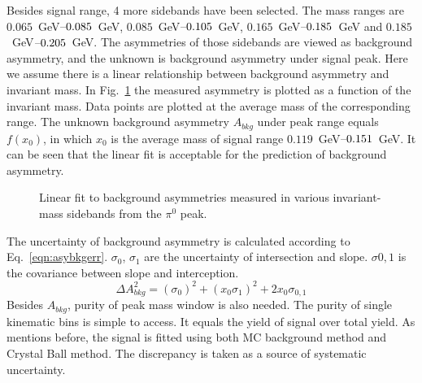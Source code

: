 Besides signal range, 4 more sidebands have been selected. The mass ranges are $0.065$~GeV$\textup{--}0.085$~GeV, $0.085$~GeV$\textup{--}0.105$~GeV, $0.165$~GeV$\textup{--}0.185$~GeV and $0.185$~GeV$\textup{--}0.205$~GeV. The asymmetries of those sidebands are viewed as background asymmetry, and the unknown is background asymmetry under signal peak. Here we assume there is a linear relationship between background asymmetry and invariant mass. In Fig.~\ref{fig:bkgasy}  the measured asymmetry is plotted as a function of the invariant mass. Data points are plotted at the average mass of the corresponding range. The unknown background asymmetry $A_{bkg}$ under peak range equals $f(x_0)$, in which $x_0$ is the average mass of signal range $0.119$~GeV$\textup{--}0.151$~GeV. It can be seen that the linear fit is acceptable for the prediction of background asymmetry.  
\begin{figure}[H]
  \centering     
  \caption{ Linear fit to background asymmetries measured in various invariant-mass sidebands from the $\pi^0$ peak.}
  \label{fig:bkgasy}
\end{figure}

The uncertainty of background asymmetry is calculated according to Eq.~\eqref{eqn:asybkgerr}. $\sigma_0$, $\sigma_1$ are the uncertainty of intersection and slope. $\sigma{0,1}$ is the covariance between slope and interception.
\begin{equation}
\Delta A^2_{bkg}= (\sigma_0)^2 + (x_0\sigma_1)^2 + 2x_0\sigma_{0,1}
\label{eqn:asybkgerr}
\end{equation}
Besides $A_{bkg}$, purity of peak mass window is also needed. The purity of single kinematic bins is simple to access. It equals the yield of signal over total yield. As mentions before, the signal is fitted using both MC background method and Crystal Ball method. The discrepancy is taken as a source of systematic uncertainty.

